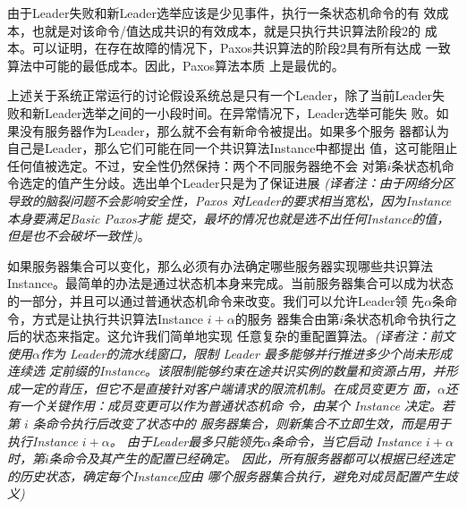 由于Leader失败和新Leader选举应该是少见事件，执行一条状态机命令的有
效成本，也就是对该命令/值达成共识的有效成本，就是只执行共识算法阶段2的
成本。可以证明，在存在故障的情况下，Paxos共识算法的阶段2具有所有达成
一致算法中可能的最低成本\cite{keidar2001cost}。因此，Paxos算法本质
上是最优的。

上述关于系统正常运行的讨论假设系统总是只有一个Leader，除了当前Leader失
败和新Leader选举之间的一小段时间。在异常情况下，Leader选举可能失
败。如果没有服务器作为Leader，那么就不会有新命令被提出。如果多个服务
器都认为自己是Leader，那么它们可能在同一个共识算法Instance中都提出
值，这可能阻止任何值被选定。不过，安全性仍然保持：两个不同服务器绝不会
对第\(i\)条状态机命令选定的值产生分歧。选出单个Leader只是为了保证进展
\emph{(译者注：由于网络分区导致的脑裂问题不会影响安全性，Paxos
对Leader的要求相当宽松，因为Instance本身要满足Basic Paxos才能
提交，最坏的情况也就是选不出任何Instance的值，但是也不会破坏一致性)}。

如果服务器集合可以变化，那么必须有办法确定哪些服务器实现哪些共识算法
Instance。最简单的办法是通过状态机本身来完成。当前服务器集合可以成为状态
的一部分，并且可以通过普通状态机命令来改变。我们可以允许Leader领
先\(\alpha\)条命令，方式是让执行共识算法Instance \(i+\alpha\)的服务
器集合由第\(i\)条状态机命令执行之后的状态来指定。这允许我们简单地实现
任意复杂的重配置算法。\emph{(译者注：前文使用\(\alpha\)作为
Leader的流水线窗口，限制 Leader 最多能够并行推进多少个尚未形成连续选
定前缀的Instance。该限制能够约束在途共识实例的数量和资源占用，并形
成一定的背压，但它不是直接针对客户端请求的限流机制。在成员变更方
面，\(\alpha\)还有一个关键作用：成员变更可以作为普通状态机命
令，由某个 Instance 决定。若第 \(i\) 条命令执行后改变了状态中的
服务器集合，则新集合不立即生效，而是用于执行Instance \(i+\alpha\)。
由于Leader最多只能领先\(\alpha\)条命令，当它启动
Instance \(i+\alpha\)时，第\(i\)条命令及其产生的配置已经确定。
因此，所有服务器都可以根据已经选定的历史状态，确定每个Instance应由
哪个服务器集合执行，避免对成员配置产生歧义)}
